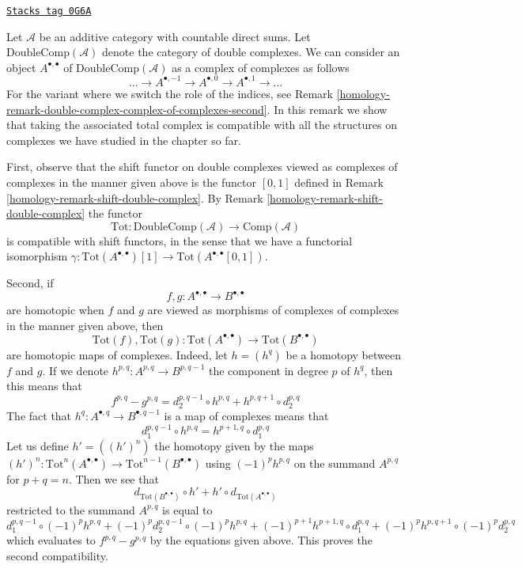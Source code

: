 \begin{remark}
\label{homology-remark-double-complex-complex-of-complexes-first}
\href{https://stacks.math.columbia.edu/tag/0G6A}{\texttt{Stacks tag 0G6A}}

Let $\mathcal{A}$ be an additive category with countable direct sums.
Let $\text{DoubleComp}(\mathcal{A})$ denote the category of double complexes.
We can consider an object $A^{\bullet, \bullet}$ of
$\text{DoubleComp}(\mathcal{A})$ as a complex of complexes
as follows
$$
\ldots \to A^{\bullet, -1} \to A^{\bullet, 0} \to A^{\bullet, 1} \to \ldots
$$
For the variant where we switch the role of the indices, see
Remark \ref{homology-remark-double-complex-complex-of-complexes-second}.
In this remark we show that taking the associated total complex
is compatible with all the structures on complexes we have studied
in the chapter so far.

\medskip\noindent
First, observe that the shift functor on double complexes viewed
as complexes of complexes in the manner given above is the functor
$[0, 1]$ defined in Remark \ref{homology-remark-shift-double-complex}.
By Remark \ref{homology-remark-shift-double-complex} the functor
$$
\text{Tot} : \text{DoubleComp}(\mathcal{A}) \to \text{Comp}(\mathcal{A})
$$
is compatible with shift functors, in the sense that we have a functorial
isomorphism $\gamma : \text{Tot}(A^{\bullet, \bullet})[1] \to
\text{Tot}(A^{\bullet, \bullet}[0, 1])$.

\medskip\noindent
Second, if
$$
f, g : A^{\bullet, \bullet} \to B^{\bullet, \bullet}
$$
are homotopic when $f$ and $g$ are viewed as morphisms of complexes
of complexes in the manner given above, then
$$
\text{Tot}(f), \text{Tot}(g) :
\text{Tot}(A^{\bullet, \bullet}) \to \text{Tot}(B^{\bullet, \bullet})
$$
are homotopic maps of complexes. Indeed, let $h = (h^q)$
be a homotopy between $f$ and $g$. If we denote
$h^{p, q} : A^{p, q} \to B^{p, q - 1}$ the component in degree $p$ of $h^q$,
then this means that
$$
f^{p, q} - g^{p, q} = d_2^{p, q - 1} \circ h^{p, q} +
h^{p, q + 1} \circ d_2^{p, q}
$$
The fact that $h^q : A^{\bullet, q} \to B^{\bullet, q - 1}$ is a map of
complexes means that
$$
d_1^{p, q - 1} \circ h^{p, q} = h^{p + 1, q} \circ d_1^{p, q}
$$
Let us define $h' = ((h')^n)$ the homotopy given by the maps
$(h')^n : \text{Tot}^n(A^{\bullet, \bullet}) \to
\text{Tot}^{n - 1}(B^{\bullet, \bullet})$
using $(-1)^ph^{p, q}$ on the summand $A^{p, q}$ for $p + q = n$.
Then we see that
$$
d_{\text{Tot}(B^{\bullet, \bullet})} \circ h' +
h' \circ d_{\text{Tot}(A^{\bullet, \bullet})}
$$
restricted to the summand $A^{p, q}$ is equal to
$$
d_1^{p, q - 1} \circ (-1)^p h^{p, q} +
(-1)^p d_2^{p, q - 1} \circ (-1)^p h^{p, q} +
(-1)^{p + 1} h^{p + 1, q} \circ d_1^{p, q} +
(-1)^p h^{p, q + 1} \circ (-1)^p d_2^{p, q}
$$
which evaluates to $f^{p, q} - g^{p, q}$ by the equations given above.
This proves the second compatibility.


\end{remark}
